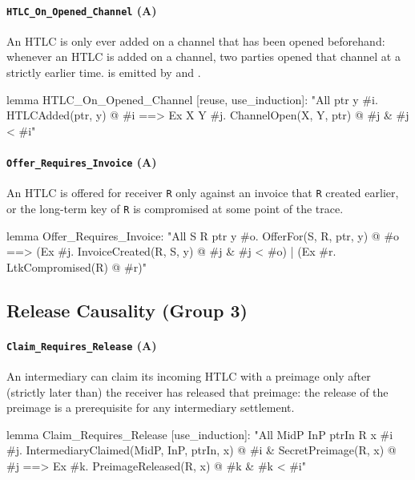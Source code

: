 \paragraph{\texttt{HTLC\_On\_Opened\_Channel} (A)}
An HTLC is only ever added on a channel that has been opened beforehand: whenever an HTLC is
added on a channel, two parties opened that channel at a strictly earlier time.
 is emitted by  and .
\begin{spthy}
lemma HTLC_On_Opened_Channel [reuse, use_induction]:
    "All ptr y #i.
        HTLCAdded(ptr, y) @ #i
     ==> Ex X Y #j. ChannelOpen(X, Y, ptr) @ #j & #j < #i"
\end{spthy}

\paragraph{\texttt{Offer\_Requires\_Invoice} (A)}
An HTLC is offered for receiver \texttt{R} only against an invoice that \texttt{R} created
earlier, or the long-term key of \texttt{R} is compromised at some point of the trace.
\begin{spthy}
lemma Offer_Requires_Invoice:
    "All S R ptr y #o.
        OfferFor(S, R, ptr, y) @ #o
     ==> (Ex #j. InvoiceCreated(R, S, y) @ #j & #j < #o)
       | (Ex #r. LtkCompromised(R) @ #r)"
\end{spthy}

\subsection{Release Causality (Group 3)}\label{app:release}

\paragraph{\texttt{Claim\_Requires\_Release} (A)}
An intermediary can claim its incoming HTLC with a preimage only after (strictly later than) the
receiver has released that preimage: the release of the preimage is a prerequisite for any
intermediary settlement.
\begin{spthy}
lemma Claim_Requires_Release [use_induction]:
    "All MidP InP ptrIn R x #i #j.
        IntermediaryClaimed(MidP, InP, ptrIn, x) @ #i
      & SecretPreimage(R, x) @ #j
     ==> Ex #k. PreimageReleased(R, x) @ #k & #k < #i"
\end{spthy}

